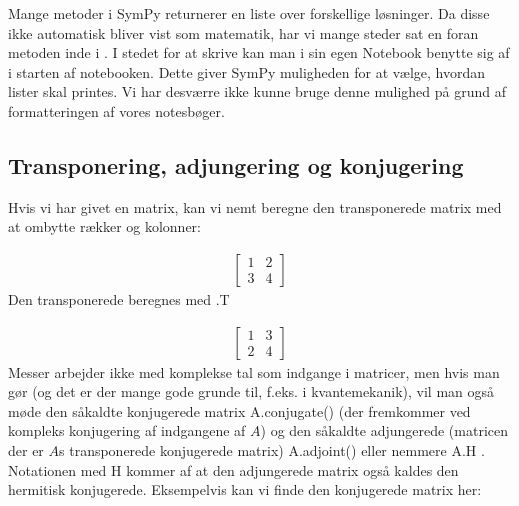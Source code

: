 \documentclass[letterpaper,10pt,english]{jupyterBook}
\begin{document}
 Mange metoder i SymPy returnerer en liste over forskellige løsninger. Da disse ikke automatisk bliver vist som matematik, har vi mange steder sat en \sphinxcode{\sphinxupquote{*}} foran metoden inde i . I stedet for at skrive  kan man i sin egen Notebook benytte sig af  i starten af notebooken. Dette giver SymPy muligheden for at vælge, hvordan lister skal printes. Vi har desværre ikke kunne bruge denne mulighed på grund af formatteringen af vores notesbøger.


\subsection{Transponering, adjungering og konjugering}
\label{\detokenize{notebooks/sympy/Notebook_LinAlg_2:transponering-adjungering-og-konjugering}}
Hvis vi har givet en matrix, kan vi nemt beregne den transponerede matrix med at ombytte rækker og kolonner:

\begin{sphinxVerbatim}[commandchars=\\\{\}]
  \PYG{p}{[}\PYG{p}{[} \PYG{p}{]} \PYG{p}{[} \PYG{p}{]}\PYG{p}{]}
\end{sphinxVerbatim}
\begin{equation*}
\begin{split}\displaystyle \left[\begin{matrix}1 & 2\\3 & 4\end{matrix}\right]\end{split}
\end{equation*}
Den transponerede beregnes med .T

\begin{sphinxVerbatim}[commandchars=\\\{\}]
    
\end{sphinxVerbatim}
\begin{equation*}
\begin{split}\displaystyle \left[\begin{matrix}1 & 3\\2 & 4\end{matrix}\right]\end{split}
\end{equation*}
Messer arbejder ikke med komplekse tal som indgange i matricer, men hvis man gør (og det er der mange gode grunde til, f.eks. i kvantemekanik), vil man også møde den såkaldte konjugerede matrix A.conjugate() (der fremkommer ved kompleks konjugering af indgangene af \(A\)) og den såkaldte adjungerede (matricen der er \(A\)s transponerede konjugerede matrix) A.adjoint() eller nemmere A.H . Notationen med H kommer af at den adjungerede matrix også kaldes den hermitisk konjugerede.
Eksempelvis kan vi finde den konjugerede matrix her:
\end{document}
